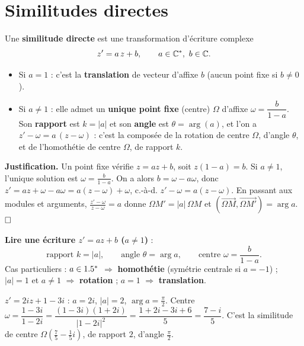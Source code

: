 \section{Similitudes directes}

\begin{theoreme}
Une \textbf{similitude directe} est une transformation d'écriture complexe
\[
z'=a\,z+b,\qquad a\in\mathbb{C}^{*},\ b\in\mathbb{C}.
\]
\begin{itemize}
\item Si $a=1$ : c'est la \textbf{translation} de vecteur d'affixe $b$ (aucun point fixe si $b\neq0$).
\item Si $a\neq1$ : elle admet un \textbf{unique point fixe} (centre) $\Omega$ d'affixe
$\omega=\dfrac{b}{1-a}$. Son \textbf{rapport} est $k=|a|$ et son \textbf{angle} est $\theta=\arg(a)$,
et l'on a $z'-\omega=a\,(z-\omega)$ : c'est la composée de la rotation de centre $\Omega$, d'angle
$\theta$, et de l'homothétie de centre $\Omega$, de rapport $k$.
\end{itemize}
\end{theoreme}

\noindent\textbf{Justification.} Un point fixe vérifie $z=az+b$, soit $z(1-a)=b$. Si $a\neq1$,
l'unique solution est $\omega=\frac b{1-a}$. On a alors $b=\omega-a\omega$, donc
$z'=az+\omega-a\omega=a(z-\omega)+\omega$, c.-à-d. $z'-\omega=a(z-\omega)$. En passant aux modules
et arguments, $\frac{z'-\omega}{z-\omega}=a$ donne $\Omega M'=|a|\,\Omega M$ et
$(\overrightarrow{\Omega M},\overrightarrow{\Omega M'})=\arg a$. $\hfill\square$

\begin{aretenir}
\textbf{Lire une écriture $z'=az+b$ ($a\neq1$)} :
\[
\text{rapport } k=|a|,\qquad \text{angle } \theta=\arg a,\qquad \text{centre } \omega=\frac b{1-a}.
\]
Cas particuliers : $a\in1.5^{*}$ $\Rightarrow$ \textbf{homothétie} (symétrie centrale si $a=-1$) ;
$|a|=1$ et $a\neq1$ $\Rightarrow$ \textbf{rotation} ; $a=1$ $\Rightarrow$ \textbf{translation}.
\end{aretenir}

\begin{exemple}
$z'=2iz+1-3i$ : $a=2i$, $|a|=2$, $\arg a=\frac\pi2$. Centre
$\omega=\dfrac{1-3i}{1-2i}=\dfrac{(1-3i)(1+2i)}{|1-2i|^{2}}=\dfrac{1+2i-3i+6}{5}=\dfrac{7-i}{5}$.
C'est la similitude de centre $\Omega\!\left(\frac75-\frac15 i\right)$, de rapport $2$, d'angle $\frac\pi2$.
\end{exemple}

